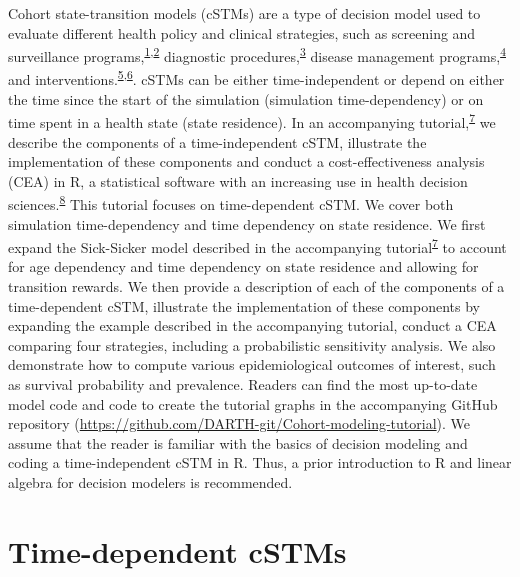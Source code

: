 \documentclass[
]{article}
\begin{document}
Cohort state-transition models (cSTMs) are a type of decision model used to evaluate different health policy and clinical strategies, such as screening and surveillance programs,\textsuperscript{\protect\hyperlink{ref-Suijkerbuijk2018}{1},\protect\hyperlink{ref-Sathianathen2018a}{2}} diagnostic procedures,\textsuperscript{\protect\hyperlink{ref-Lu2018b}{3}} disease management programs,\textsuperscript{\protect\hyperlink{ref-Djatche2018}{4}} and interventions.\textsuperscript{\protect\hyperlink{ref-Pershing2014}{5},\protect\hyperlink{ref-Smith-Spangler2010}{6}}. cSTMs can be either time-independent or depend on either the time since the start of the simulation (simulation time-dependency) or on time spent in a health state (state residence). In an accompanying tutorial,\textsuperscript{\protect\hyperlink{ref-Alarid-Escudero2021a}{7}} we describe the components of a time-independent cSTM, illustrate the implementation of these components and conduct a cost-effectiveness analysis (CEA) in R, a statistical software with an increasing use in health decision sciences.\textsuperscript{\protect\hyperlink{ref-Jalal2017b}{8}} This tutorial focuses on time-dependent cSTM. We cover both simulation time-dependency and time dependency on state residence. We first expand the Sick-Sicker model described in the accompanying tutorial\textsuperscript{\protect\hyperlink{ref-Alarid-Escudero2021a}{7}} to account for age dependency and time dependency on state residence and allowing for transition rewards. We then provide a description of each of the components of a time-dependent cSTM, illustrate the implementation of these components by expanding the example described in the accompanying tutorial, conduct a CEA comparing four strategies, including a probabilistic sensitivity analysis. We also demonstrate how to compute various epidemiological outcomes of interest, such as survival probability and prevalence. Readers can find the most up-to-date model code and code to create the tutorial graphs in the accompanying GitHub repository (\url{https://github.com/DARTH-git/Cohort-modeling-tutorial}). We assume that the reader is familiar with the basics of decision modeling and coding a time-independent cSTM in R. Thus, a prior introduction to R and linear algebra for decision modelers is recommended.

\hypertarget{time-dependent-cstms}{%
\section{Time-dependent cSTMs}\label{time-dependent-cstms}}
\end{document}
